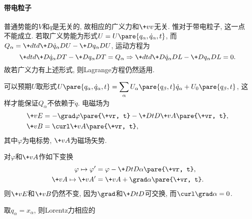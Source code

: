 \documentclass{ctexart}
\begin{document}
\paragraph{带电粒子} %
\label{par:带电粒子}

普通势能的$V$和$\dot{q}$是无关的, 故相应的广义力和$\+vv$无关. 惟对于带电粒子, 这一点不能成立. 若取广义势能为形式$U = U\pare{q_\alpha, \dot{q}_\alpha, t}$, 而$Q_\alpha = \displaystyle \+dtd{} \+D{\dot{q}_\alpha}DU - \+D{q_\alpha}DU$, 运动方程为
\[ \+dtd{} \+D{\dot{q}_\alpha}DT - \+D{q_\alpha}DT = Q_\alpha \Rightarrow \+dtd{} \+D{\dot{q}_\alpha}DL - \+D{q_\alpha}DL = 0. \]
故若广义力有上述形式, 则Lagrange方程仍然适用.
\par
可以预期$U$取形式$U\pare{q_\alpha, \dot{q}_\alpha, t} = \displaystyle \sum_\alpha U_\alpha\pare{q_\beta,t}\dot{q}_\alpha + U_0\pare{q_\beta, t}$, 这样才能保证$Q_\alpha$不依赖于$\ddot{q}$. 电磁场为
\begin{align*}
    \+vE &= -\grad \varphi\pare{\+vr, t} - \+DtD{\+vA\pare{\+vr, t}},\\
    \+vB &= \curl \+vA\pare{\+vr, t},
\end{align*}
其中$\varphi$为电标势, $\+vA$为磁场矢势.
\begin{remark}[规范不变性]
    对$\varphi$和$\+vA$作如下变换
    \begin{align*}
        \varphi \mapsto \varphi' &= \varphi - \+DtD{}\alpha\pare{\+vr, t}, \\
        \+vA \mapsto \+vA' &= \+vA + \grad \alpha\pare{\+vr, t}.
    \end{align*}
    则$\+vE$和$\+vB$仍然不变, 因为$\grad$和$\displaystyle \+DtD{}$可交换, 而$\curl\grad\alpha = 0$.
\end{remark}
取$q_\alpha = x_\alpha$, 则Lorentz力相应的
\end{document}
